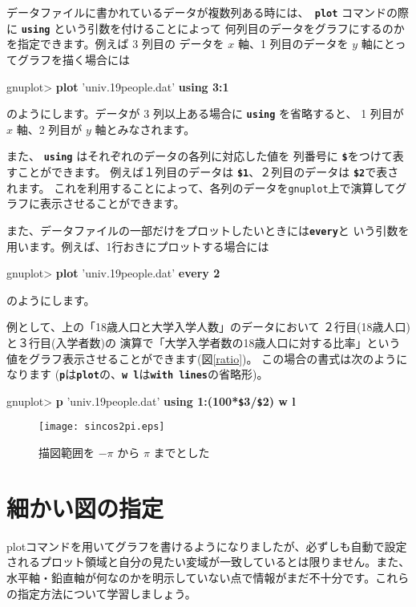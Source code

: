 \documentclass[a4j]{ujarticle} %
\newenvironment{terminal}{%
  \begin{center}
   \begin{minipage}{.8\textwidth}
    \setlength{\FrameSep}{.5\FrameSep}%
    \begin{framed}\ttfamily\small%
     \setlength\baselineskip{.85\baselineskip}%
}{%
    \end{framed}
   \end{minipage}
  \end{center}%
}
\begin{document}
データファイルに書かれているデータが複数列ある時には、{\tt\bf
plot} コマンドの際に {\tt\bf using} という引数を付けることによって
何列目のデータをグラフにするのかを指定できます。例えば 3 列目の
データを $x$ 軸、1 列目のデータを $y$ 軸にとってグラフを描く場合には
\begin{terminal}
gnuplot> {\bf plot} 'univ.19people.dat' {\bf using 3:1}
\end{terminal}
のようにします。データが 3 列以上ある場合に {\tt\bf using} を省略すると、
1 列目が $x$ 軸、2 列目が $y$ 軸とみなされます。

\vspace*{1zw}
また、 {\tt\bf using} はそれぞれのデータの各列に対応した値を
列番号に {\tt\bf \$}をつけて表すことができます。
例えば１列目のデータは {\tt\bf \$1}、２列目のデータは {\tt\bf \$2}で表さ
れます。
これを利用することによって、各列のデータを{\tt gnuplot}上で演算してグラフに表示させることができます。

また、データファイルの一部だけをプロットしたいときには{\tt\bf every}と
いう引数を用います。例えば、1行おきにプロットする場合には
\begin{terminal}
gnuplot> {\bf plot} 'univ.19people.dat' {\bf every 2}
\end{terminal}
のようにします。

例として、上の「18歳人口と大学入学人数」のデータにおいて
２行目(18歳人口)と３行目(入学者数)の
演算で「大学入学者数の18歳人口に対する比率」という値をグラフ表示させることができます(図\ref{ratio})。
この場合の書式は次のようになります
({\tt\bf p}は{\tt\bf plot}の、{\tt\bf w l}は{\tt\bf with lines}の省略形)。

\begin{terminal}
gnuplot> {\bf p} 'univ.19people.dat' {\bf using 1:(100*{\tt \$}3/{\tt \$}2) w l}
\end{terminal}

\begin{figure}
\begin{center}
\begin{minipage}[hbtp]{0.49\textwidth}
\texttt{[image: sincos2pi.eps]}
\caption{描図範囲を $-\pi$ から $\pi$ までとした}
\label{sincos2pi}
\end{minipage}
\end{center}
\end{figure}

\section{細かい図の指定}
plotコマンドを用いてグラフを書けるようになりましたが、必ずしも自動で設定されるプロット領域と自分の見たい変域が一致しているとは限りません。また、水平軸・鉛直軸が何なのかを明示していない点で情報がまだ不十分です。これらの指定方法について学習しましょう。
\end{document}
